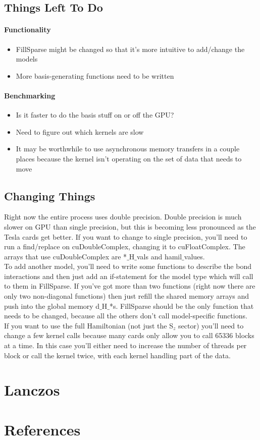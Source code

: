 \documentclass{article}
\begin{document}
\subsection{Things Left To Do}
\paragraph{Functionality}
\begin{itemize}
\item{FillSparse might be changed so that it's more intuitive to add/change the models}
\item{More basis-generating functions need to be written}
\end{itemize}
\paragraph{Benchmarking}
\begin{itemize}
\item{Is it faster to do the basis stuff on or off the GPU?}
\item{Need to figure out which kernels are slow}
\item{It may be worthwhile to use asynchronous memory transfers in a couple places because the kernel isn't operating on the set of data that needs to move}
\end{itemize}

\subsection{Changing Things}
Right now the entire process uses double precision. Double precision is much slower on GPU than single precision, but this is becoming less pronounced as the Tesla cards get better. If you want to change to single precision, you'll need to run a find/replace on cuDoubleComplex, changing it to cuFloatComplex. The arrays that use cuDoubleComplex are *$\_$H$\_$vals and hamil$\_$values.\\ 
To add another model, you'll need to write some functions to describe the bond interactions and then just add an if-statement for the model type which will call to them in FillSparse. If you've got more than two functions (right now there are only two non-diagonal functions) then just refill the shared memory arrays and push into the global memory d$\_$H$\_$*s. FillSparse should be the only function that needs to be changed, because all the others don't call model-specific functions.\\
If you want to use the full Hamiltonian (not just the S$_z$ sector) you'll need to change a few kernel calls because many cards only allow you to call 65336 blocks at a time. In this case you'll either need to increase the number of threads per block or call the kernel twice, with each kernel handling part of the data. 
 

\section{Lanczos}

\section{References}
\end{document}
